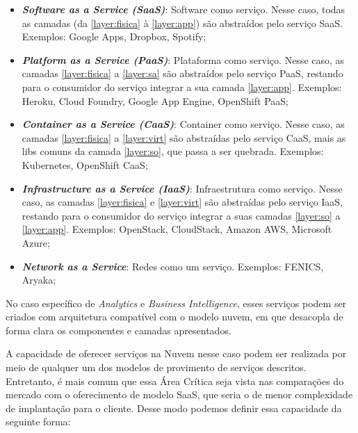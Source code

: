 \begin{itemize}
    \item \label{saas} \textbf{\emph{Software as a Service (SaaS)}}: Software como serviço. Nesse caso, todas as camadas (da \ref{layer:fisica} à \ref{layer:app}) são abstraídos pelo serviço SaaS. Exemplos: Google Apps, Dropbox, Spotify;
    
    \item \label{paas} \textbf{\emph{Platform as a Service (PaaS)}}: Plataforma como serviço. Nesse caso, as camadas \ref{layer:fisica} a \ref{layer:sa} são abstraídos pelo serviço PaaS, restando para o consumidor do serviço integrar a sua camada \ref{layer:app}. Exemplos: Heroku, Cloud Foundry, Google App Engine, OpenShift PaaS;

    \item \label{caas} \textbf{\emph{Container as a Service (CaaS)}}: Container como serviço. Nesse caso, as camadas \ref{layer:fisica} a \ref{layer:virt} são abstraídas pelo serviço CaaS, mais as libs comuns da camada \ref{layer:so}, que passa a ser quebrada. Exemplos: Kubernetes, OpenShift CaaS;

    \item \label{iaas} \textbf{\emph{Infrastructure as a Service (IaaS)}}: Infraestrutura como serviço. Nesse caso, as camadas \ref{layer:fisica} e \ref{layer:virt} são abstraídas pelo serviço IaaS, restando para o consumidor do serviço integrar a suas camadas \ref{layer:so} a \ref{layer:app}. Exemplos: OpenStack, CloudStack, Amazon AWS, Microsoft Azure;

    \item \textbf{\emph{Network as a Service}}: Redes como um serviço. Exemplos:  FENICS, Aryaka;
\end{itemize}


No caso específico de \emph{Analytics} e \emph{Business Intelligence}, esses serviços podem ser criados com arquitetura compatível com o modelo nuvem, em que desacopla de forma clara os componentes e camadas apresentados.

A capacidade de oferecer serviços na Nuvem nesse caso podem ser realizada por meio de qualquer um dos modelos de provimento de serviços descritos. Entretanto, é mais comum que essa Área Crítica seja vista nas comparações do mercado com o oferecimento de modelo SaaS, que seria o de menor complexidade de implantação para o cliente. Desse modo podemos definir essa capacidade da seguinte forma:

